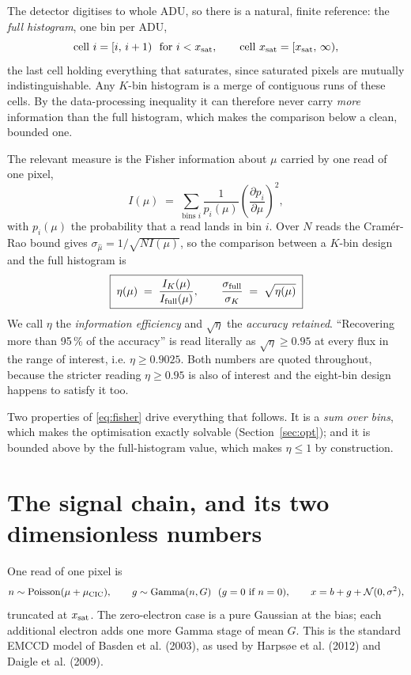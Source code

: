 \documentclass[11pt,a4paper]{article}
\newcommand{\ADU}{\ensuremath{\mathrm{ADU}}}
\begin{document}
The detector digitises to whole \ADU, so there is a natural, finite reference:
the \emph{full histogram}, one bin per \ADU,
\begin{equation}
  \text{cell } i = [i,\,i+1) \ \ \text{for } i < x_{\rm sat},
  \qquad
  \text{cell } x_{\rm sat} = [x_{\rm sat},\,\infty),
\end{equation}
the last cell holding everything that saturates, since saturated pixels are
mutually indistinguishable. Any $K$-bin histogram is a merge of contiguous runs
of these cells. By the data-processing inequality it can therefore never carry
\emph{more} information than the full histogram, which makes the comparison
below a clean, bounded one.

The relevant measure is the Fisher information about $\mu$ carried by one read
of one pixel,
\begin{equation}
  I(\mu) \;=\; \sum_{\text{bins } i} \frac{1}{p_i(\mu)}
                \left(\frac{\partial p_i}{\partial \mu}\right)^{2},
  \label{eq:fisher}
\end{equation}
with $p_i(\mu)$ the probability that a read lands in bin $i$. Over $N$ reads the
Cram\'er-Rao bound gives $\sigma_{\hat\mu} = 1/\sqrt{N I(\mu)}$, so the
comparison between a $K$-bin design and the full histogram is
\begin{equation}
  \boxed{\;
  \eta(\mu) \;=\; \frac{I_K(\mu)}{I_{\rm full}(\mu)},
  \qquad
  \frac{\sigma_{\rm full}}{\sigma_K} \;=\; \sqrt{\eta(\mu)}\;}
  \label{eq:eta}
\end{equation}
We call $\eta$ the \emph{information efficiency} and $\sqrt{\eta}$ the
\emph{accuracy retained}. ``Recovering more than 95\,\% of the accuracy'' is
read literally as $\sqrt{\eta} \ge 0.95$ at every flux in the range of
interest, i.e. $\eta \ge 0.9025$. Both numbers are quoted throughout, because
the stricter reading $\eta \ge 0.95$ is also of interest and the eight-bin
design happens to satisfy it too.

Two properties of \eqref{eq:fisher} drive everything that follows. It is a
\emph{sum over bins}, which makes the optimisation exactly solvable
(Section~\ref{sec:opt}); and it is bounded above by the full-histogram value,
which makes $\eta \le 1$ by construction.

\section{The signal chain, and its two dimensionless numbers}

One read of one pixel is
\begin{equation}
  n \sim \mathrm{Poisson}(\mu + \mu_{\rm CIC}),
  \qquad
  g \sim \mathrm{Gamma}(n, G) \ \ (g=0 \text{ if } n=0),
  \qquad
  x = b + g + \mathcal{N}(0,\sigma^2),
\end{equation}
truncated at $x_{\rm sat}$. The zero-electron case is a pure Gaussian at the
bias; each additional electron adds one more Gamma stage of mean $G$. This is
the standard EMCCD model of Basden et al. (2003), as used by Harps{\o}e et al.
(2012) and Daigle et al. (2009).
\end{document}
